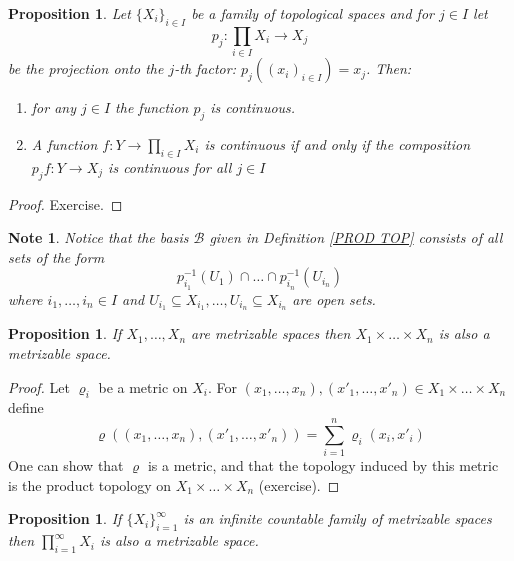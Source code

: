 \documentclass[11pt, letterpaper, oneside]{report}
\theoremstyle{pplain}
\newtheorem{proposition}[theorem]{Proposition}
\newtheorem{ITERMVALUE THM}[theorem]{Intermediate Value Theorem}
\newtheorem{HEINEBOREL THM}[theorem]{Heine-Borel Theorem}
\newtheorem{UMETR THM}[theorem]{Urysohn Metrization Theorem}
\newtheorem{UMETR2 THM}[theorem]{Urysohn Metrization Theorem (v.2)}
\theoremstyle{ddefinition}
\newtheorem{note}[theorem]{Note}
\theoremstyle{nnn}
\newtheorem{TDA NN}[theorem]{Topological Data Analysis. }
\theoremstyle{eexercise}
\newcommand{\BB}{{\mathcal B}}
\newcommand{\benu}{\begin{enumerate}}
\newcommand{\eenu}{\end{enumerate}}
\begin{document}
\begin{proposition}
\label{UNIV PROP PROD PROP}
Let $\{X_{i}\}_{i\in I}$ be a family of topological spaces and for $j\in I$ let 
$$p_{j}\colon \prod_{i\in I} X_{i}  \to X_{j}$$
be the projection onto the $j$-th factor: $p_{j}((x_{i})_{i\in I}) = x_{j}$. Then: 
\benu 
\item for any $j\in I$ the function $p_{j}$ is continuous. 
\item A function $f\colon Y\to \prod_{i\in I}X_{i}$ is continuous if and only if the composition 
$p_{j}f\colon Y \to X_{j}$ is continuous for all $j\in I$
\eenu
\end{proposition}

\begin{proof}
Exercise. 
\end{proof}

\begin{note}
\label{PROD BASIS NOTE}
Notice that the basis $\BB$ given in Definition  \ref{PROD TOP}  consists of all sets of the form
$$p_{i_{1}}^{-1}(U_{1})\cap \dots \cap  p_{i_{n}}^{-1}(U_{i_{n}})$$
where $i_{1}, \dots, i_{n}\in I$ and 
 $U_{i_{1}}\subseteq X_{i_{1}}, \dots,  U_{i_{n}}\subseteq X_{i_{n}}$ are open  sets.    
\end{note}


\begin{proposition}
\label{FINITE PROD OF METRIC SP PROP}
If $X_{1}, \dots, X_{n}$ are metrizable spaces then $X_{1}\times \dots \times X_{n}$
is also a metrizable space. 
\end{proposition}

\begin{proof}
Let $\varrho_{i}$ be a metric on $X_{i}$. For 
$(x_{1}, \dots, x_{n}), (x'_{1}, \dots, x'_{n}) \in  X_{1}\times \dots \times X_{n}$ define 
$$\varrho((x_{1}, \dots, x_{n}), (x'_{1}, \dots, x'_{n})) = \sum_{i=1}^{n} \varrho_{i}(x_{i}, x'_{i})$$
One can show that $\varrho$ is a metric, and that the topology induced by this metric 
is the product topology on $X_{1}\times \dots \times X_{n}$ (exercise).
\end{proof}


\begin{proposition}
\label{CONTABLE PROD OF METRIC SP PROP}
If $\{X_{i}\}_{i=1}^{\infty}$ is an infinite countable family of metrizable spaces then $\prod_{i=1}^{\infty} X_{i}$
is also a metrizable space. 
\end{proposition}
\end{document}
